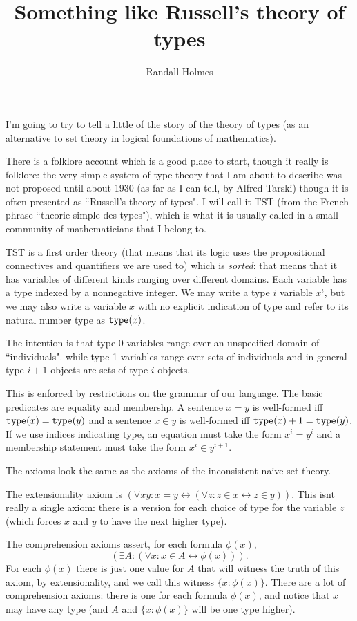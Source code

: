 \documentclass[12pt]{article}
\title{Something like Russell's theory of types}
\author{Randall Holmes}
\begin{document}
\maketitle

I'm going to try to tell a little of the story of the theory of types (as an alternative to set theory in logical foundations of mathematics).

There is a folklore account which is a good place to start, though it really is folklore:  the very simple system of type theory that I am about to describe was not proposed until about 1930 (as far as I can tell, by Alfred Tarski) though it is often presented as ``Russell's theory of types".  I will call it TST (from the French phrase ``theorie simple des types"), which is what it is usually called in a small community of mathematicians that I belong to.

TST is a first order theory (that means that its logic uses the propositional connectives and quantifiers we are used to) which is {\em sorted\/}:  that means that it has variables of different kinds ranging over different domains.   Each variable has a type indexed by a nonnegative integer.  We may write a type $i$ variable $x^i$, but we may also write a variable $x$ with no explicit indication of type and refer to
its natural number type as ${\tt type}(x)$.

The intention is that type 0 variables range over an unspecified domain of ``individuals". while type 1 variables range over sets of individuals and in general type $i+1$ objects are sets of type $i$ objects.

This is enforced by restrictions on the grammar of our language.  The basic predicates are equality and membershp.  A sentence $x=y$ is well-formed iff ${\tt type}(x)={\tt type}(y)$
and a sentence $x \in y$ is well-formed iff ${\tt type}(x)+1={\tt type}(y)$.  If we use indices indicating type, an equation must take the form $x^i = y^i$ and a membership statement must take the form $x^i \in y^{i+1}$.

The axioms look the same as the axioms of the inconsistent naive set theory.

The extensionality axiom is $(\forall xy:x=y \leftrightarrow (\forall z:z \in x \leftrightarrow z \in y))$.  This isnt really a single axiom:  there is a version for each choice of type
for the variable $z$ (which forces $x$ and $y$ to have the next higher type).

The comprehension axioms assert, for each formula $\phi(x)$, $$(\exists A:(\forall x:x \in A \leftrightarrow \phi(x))).$$ For each $\phi(x)$ there is just one value for $A$ that will witness the truth of this axiom, by extensionality, and we call this witness $\{x : \phi(x)\}$.  There are a lot of comprehension axioms:  there is one for each formula $\phi(x)$, and notice that $x$ may have any
type (and $A$ and $\{x:\phi(x)\}$ will be one type higher).
\end{document}
